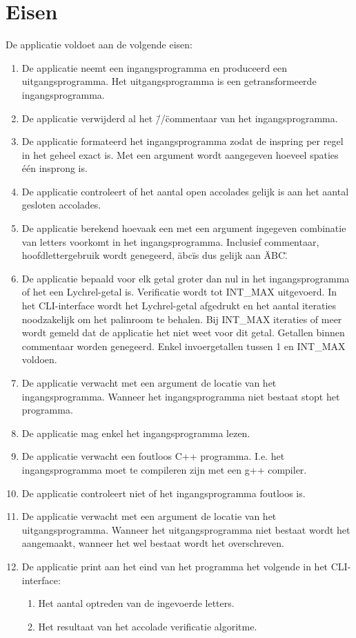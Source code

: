 \documentclass[10pt]{article}
\begin{document}
\section{Eisen}
De applicatie voldoet aan de volgende eisen:
\begin{enumerate}
      \item De applicatie neemt een ingangsprogramma en produceerd een uitgangsprogramma. Het uitgangsprogramma is een
            getransformeerde ingangsprogramma.
      \item De applicatie verwijderd al het \"//\" commentaar van het ingangsprogramma.
      \item De applicatie formateerd het ingangsprogramma zodat de inspring per regel in het geheel exact is. Met een
            argument wordt aangegeven hoeveel spaties \'e\'en insprong is.
      \item De applicatie controleert of het aantal open accolades gelijk is aan het aantal gesloten accolades.
      \item De applicatie berekend hoevaak een met een argument ingegeven combinatie van letters voorkomt in het
            ingangsprogramma. Inclusief commentaar, hoofdlettergebruik wordt genegeerd, \"abc\" is dus gelijk aan
            \"ABC\".
      \item De applicatie bepaald voor elk getal groter dan nul in het ingangsprogramma of het een Lychrel-getal is. Verificatie
            wordt tot INT\_MAX uitgevoerd. In het CLI-interface wordt het Lychrel-getal afgedrukt en het aantal iteraties
            noodzakelijk om het palinroom te behalen. Bij INT\_MAX iteraties of meer wordt gemeld dat de applicatie het niet weet voor dit
            getal. Getallen binnen commentaar worden genegeerd. Enkel invoergetallen tussen 1 en INT\_MAX voldoen.
      \item De applicatie verwacht met een argument de locatie van het ingangsprogramma. Wanneer het ingangsprogramma
            niet bestaat stopt het programma.
      \item De applicatie mag enkel het ingangsprogramma lezen.
      \item De applicatie verwacht een foutloos C++ programma. I.e. het ingangsprogramma moet te compileren zijn met een
            g++ compiler.
      \item De applicatie controleert niet of het ingangsprogramma foutloos is.
      \item De applicatie verwacht met een argument de locatie van het uitgangsprogramma. Wanneer het uitgangsprogramma
            niet bestaat wordt het aangemaakt, wanneer het wel bestaat wordt het overschreven.
      \item De applicatie print aan het eind van het programma het volgende in het CLI-interface: 
      \begin{enumerate}
            \item Het aantal optreden van de ingevoerde letters. 
            \item Het resultaat van het accolade verificatie algoritme. 
      \end{enumerate}
\end{enumerate}
\end{document}

